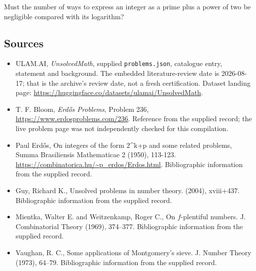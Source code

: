 \documentclass[11pt,a4paper]{article}
\begin{document}
Must the number of ways to express an integer as a prime plus a power of two be negligible compared with its logarithm?

\subsection{Sources}

{\small

\begin{itemize}

\item[\hypertarget{source:statement:1}{S1}] ULAM.AI, \emph{UnsolvedMath}, supplied \texttt{problems.json}, catalogue entry, statement and background. The embedded literature-review date is 2026-08-17; that is the archive’s review date, not a fresh certification. Dataset landing page: \url{https://huggingface.co/datasets/ulamai/UnsolvedMath}.

\item[\hypertarget{source:statement:2}{S2}] T. F. Bloom, \emph{Erdős Problems}, Problem 236, \url{https://www.erdosproblems.com/236}. Reference from the supplied record; the live problem page was not independently checked for this compilation.

\item[\hypertarget{source:statement:3}{S3}] Paul Erdős, On integers of the form 2\textasciicircum{}k+p and some related problems, Summa Brasiliensis Mathematicae 2 (1950), 113-123. \url{https://combinatorica.hu/~p_erdos/Erdos.html}. Bibliographic information from the supplied record.

\item[\hypertarget{source:statement:4}{S4}] Guy, Richard K., Unsolved problems in number theory. (2004), xviii+437. Bibliographic information from the supplied record.

\item[\hypertarget{source:statement:5}{S5}] Mientka, Walter E. and Weitzenkamp, Roger C., On {$f$}-plentiful numbers. J. Combinatorial Theory (1969), 374--377. Bibliographic information from the supplied record.

\item[\hypertarget{source:statement:6}{S6}] Vaughan, R. C., Some applications of {M}ontgomery's sieve. J. Number Theory (1973), 64--79. Bibliographic information from the supplied record.

\end{itemize}

}

\label{end:statement}
\end{document}
